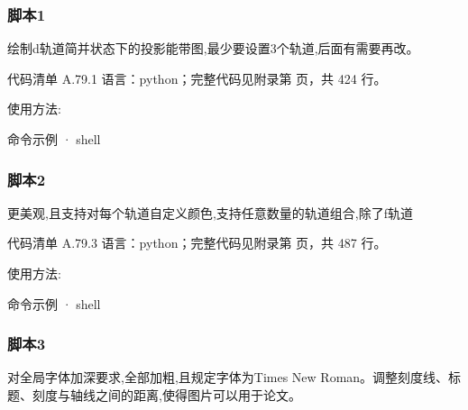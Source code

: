 \documentclass[lang=cn,scheme=chinese,color=blue,device=normal,toc=onecol,math=cm]{elegantbook}
\begin{document}
\subsubsection{脚本1}


绘制d轨道简并状态下的投影能带图,最少要设置3个轨道,后面有需要再改。\par


\begin{codeindexbox}{代码清单 A.79.1}
语言：python；完整代码见附录第 \pageref{code:79:1} 页，共 424 行。
\end{codeindexbox}


使用方法:\par


\begin{inlinecodebox}{命令示例 · shell}
\end{inlinecodebox}


\subsubsection{脚本2}


更美观,且支持对每个轨道自定义颜色,支持任意数量的轨道组合,除了f轨道\par


\begin{codeindexbox}{代码清单 A.79.3}
语言：python；完整代码见附录第 \pageref{code:79:3} 页，共 487 行。
\end{codeindexbox}


使用方法:\par


\begin{inlinecodebox}{命令示例 · shell}
\end{inlinecodebox}


\subsubsection{脚本3}


对全局字体加深要求,全部加粗,且规定字体为Times New Roman。调整刻度线、标题、刻度与轴线之间的距离,使得图片可以用于论文。\par
\end{document}
